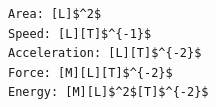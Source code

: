 \documentclass[border=10pt]{standalone}
\begin{document}
\begin{lstlisting}
Area: [L]$^2$
Speed: [L][T]$^{-1}$
Acceleration: [L][T]$^{-2}$
Force: [M][L][T]$^{-2}$
Energy: [M][L]$^2$[T]$^{-2}$
\end{lstlisting}
\end{document}
